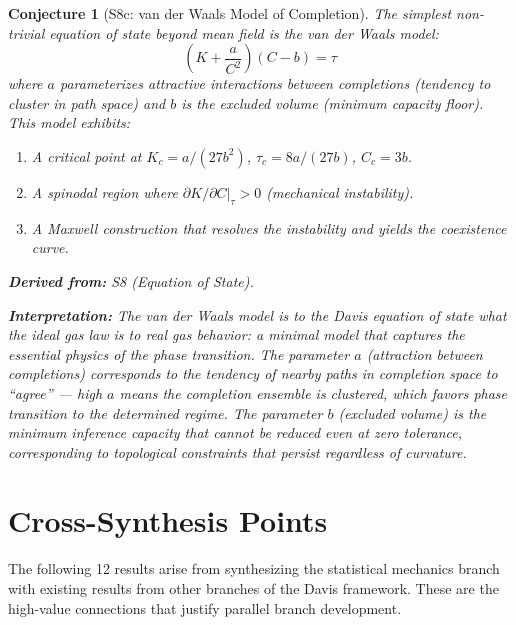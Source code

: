 \documentclass[11pt,letterpaper]{article}
\newtheorem{conjecture}{Conjecture}[section]
\begin{document}
\begin{conjecture}[S8c: van der Waals Model of 
Completion]\label{conj:vdw}
The simplest non-trivial equation of state beyond mean field is the van 
der Waals model:
\begin{equation}
    \left(K + \frac{a}{C^2}\right)(C - b) = \tau
\end{equation}
where $a$ parameterizes attractive interactions between completions 
(tendency to cluster in path space) and $b$ is the excluded volume 
(minimum capacity floor). This model exhibits:

\begin{enumerate}[label=(\alph*)]
    \item A critical point at $K_c = a/(27b^2)$, $\tau_c = 8a/(27b)$, 
    $C_c = 3b$.
    \item A spinodal region where $\partial K / \partial C|_\tau > 0$ 
    (mechanical instability).
    \item A Maxwell construction that resolves the instability and yields 
    the coexistence curve.
\end{enumerate}

\textbf{Derived from:} S8 (Equation of State).

\textbf{Interpretation:} The van der Waals model is to the Davis equation 
of state what the ideal gas law is to real gas behavior: a minimal model 
that captures the essential physics of the phase transition. The parameter 
$a$ (attraction between completions) corresponds to the tendency of 
nearby paths in completion space to ``agree'' --- high $a$ means the 
completion ensemble is clustered, which favors phase transition to the 
determined regime. The parameter $b$ (excluded volume) is the minimum 
inference capacity that cannot be reduced even at zero tolerance, 
corresponding to topological constraints that persist regardless of 
curvature.
\end{conjecture}

\newpage
\part{Cross-Synthesis Points}

The following 12 results arise from synthesizing the statistical mechanics 
branch with existing results from other branches of the Davis framework. 
These are the high-value connections that justify parallel branch 
development.
\end{document}
